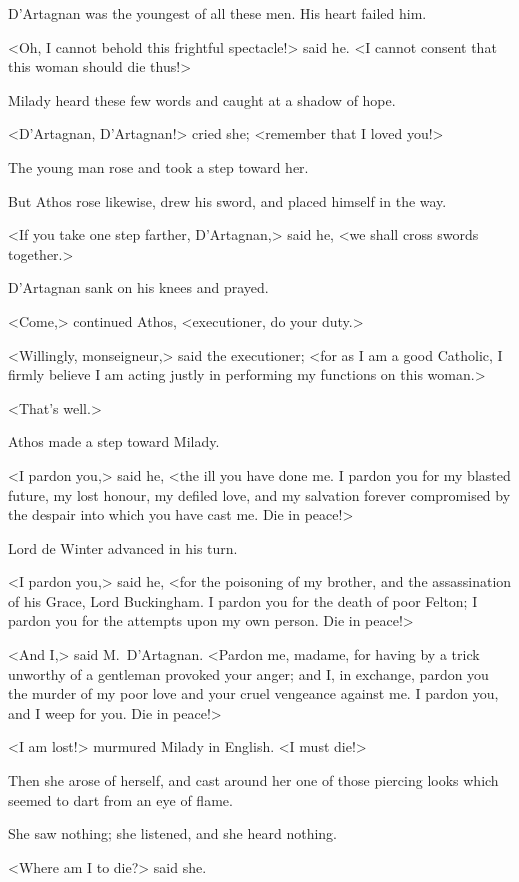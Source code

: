 D'Artagnan was the youngest of all these men. His heart failed him. 

<Oh, I cannot behold this frightful spectacle!> said he. <I cannot consent that this woman should die thus!> 

Milady heard these few words and caught at a shadow of hope. 

<D'Artagnan, D'Artagnan!> cried she; <remember that I loved you!> 

The young man rose and took a step toward her. 

But Athos rose likewise, drew his sword, and placed himself in the way. 

<If you take one step farther, D'Artagnan,> said he, <we shall cross swords together.> 

D'Artagnan sank on his knees and prayed. 

<Come,> continued Athos, <executioner, do your duty.> 

<Willingly, monseigneur,> said the executioner; <for as I am a good Catholic, I firmly believe I am acting justly in performing my functions on this woman.> 

<That's well.> 

Athos made a step toward Milady. 

<I pardon you,> said he, <the ill you have done me. I pardon you for my blasted future, my lost honour, my defiled love, and my salvation forever compromised by the despair into which you have cast me. Die in peace!> 

Lord de Winter advanced in his turn. 

<I pardon you,> said he, <for the poisoning of my brother, and the assassination of his Grace, Lord Buckingham. I pardon you for the death of poor Felton; I pardon you for the attempts upon my own person. Die in peace!> 

<And I,> said M.~D'Artagnan. <Pardon me, madame, for having by a trick unworthy of a gentleman provoked your anger; and I, in exchange, pardon you the murder of my poor love and your cruel vengeance against me. I pardon you, and I weep for you. Die in peace!> 

<I am lost!> murmured Milady in English. <I must die!> 

Then she arose of herself, and cast around her one of those piercing looks which seemed to dart from an eye of flame. 

She saw nothing; she listened, and she heard nothing. 

<Where am I to die?> said she. 

